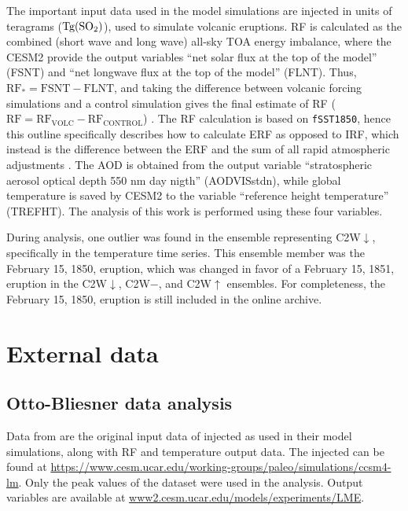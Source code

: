 \documentclass[draft]{agujournal2019}
\begin{document}
  The important input data used in the model simulations are injected  in units
  of teragrams (\(\si{\tera\gram(\ce{SO2})}\)), used to simulate volcanic eruptions. RF
  is calculated as the combined (short wave and long wave) all-sky TOA energy imbalance,
  where the CESM2 provide the output variables ``net solar flux at the top of the
  model'' (FSNT) and ``net longwave flux at the top of the model'' (FLNT). Thus,
  \(\mathrm{RF_*}= \mathrm{FSNT} - \mathrm{FLNT}\), and taking the difference between
  volcanic forcing simulations and a control simulation gives the final estimate of RF
  (\(\mathrm{RF}=\mathrm{RF_{VOLC}}-\mathrm{RF_{CONTROL}}\)) \cite{marshall2020}. The RF
  calculation is based on \texttt{fSST1850}, hence this outline specifically describes
  how to calculate ERF as opposed to IRF, which instead is the difference between the
  ERF and the sum of all rapid atmospheric adjustments \cite{marshall2020,smith2018}.
  The AOD is obtained from the output variable ``stratospheric aerosol optical depth 550
  nm day nigth'' (AODVISstdn), while global temperature is saved by CESM2 to the
  variable ``reference height temperature'' (TREFHT). The analysis of this work is
  performed using these four variables.

  During analysis, one outlier was found in the ensemble representing C2W\(\downarrow\),
  specifically in the temperature time series. This ensemble member was the February 15,
  1850, eruption, which was changed in favor of a February 15, 1851, eruption in the
  C2W\(\downarrow\), C2W\(-\), and C2W\(\uparrow\) ensembles. For completeness, the
  February 15, 1850, eruption is still included in the online archive.

  \section{External data}

  \subsection{Otto-Bliesner data analysis}

  \label{ap:ob16}

  Data from  are the original input data of injected  as
  used in their model simulations, along with RF and temperature output data. The
  injected  can be found at
  \url{https://www.cesm.ucar.edu/working-groups/paleo/simulations/ccsm4-lm}. Only the
  peak values of the  dataset were used in the analysis. Output variables are
  available at \url{www2.cesm.ucar.edu/models/experiments/LME}.
\end{document}
